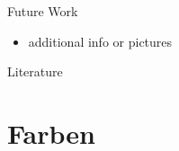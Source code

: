 \documentclass[en]{sdqbeamer}
\begin{document}
\begin{frame}{Future Work}
    \begin{itemize}
        \item additional info or pictures
    \end{itemize}
\end{frame}

\appendix
\beginbackup



\begin{frame}{Literature}
    \printbibliography
\end{frame}

\section{Farben}
\backupend
\end{document}
